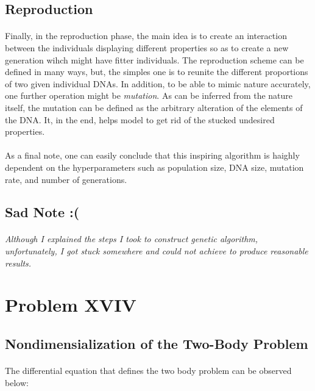 \documentclass[letterpaper,12pt]{article}
\begin{document}
\subsection{Reproduction}
\paragraph{} Finally, in the reproduction phase, the main idea is to create an interaction between the individuals displaying different properties so as to create a new generation wihch might have fitter individuals. The reproduction scheme can be defined in many ways, but, the simples one is to reunite the different proportions of two given individual DNAs. In addition, to be able to mimic nature accurately, one further operation might be \textit{mutation}. As can be inferred from the nature itself, the mutation can be defined as the arbitrary alteration of the elements of the DNA. It, in the end, helps model to get rid of the stucked undesired properties.

\paragraph{} As a final note, one can easily conclude that this inspiring algorithm is haighly dependent on the hyperparameters such as population size, DNA size, mutation rate, and number of generations. 

\subsection{Sad Note :(}
\paragraph{} \emph{Although I explained the steps I took to construct genetic algorithm, unfortunately, I got stuck somewhere and could not achieve to produce reasonable results.}
\section{Problem XVIV}
\subsection{Nondimensialization of the Two-Body Problem}
\paragraph{} The differential equation that defines the two body problem can be observed below:
\end{document}
